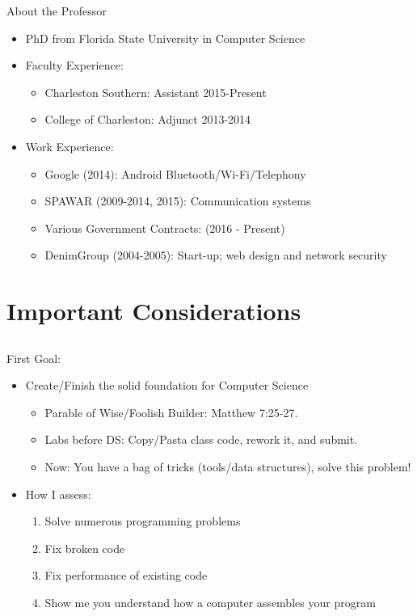 \documentclass{beamer}
\begin{document}
\begin{frame}{About the Professor}
\begin{itemize}
\item PhD from Florida State University in Computer Science
\item Faculty Experience:
\begin{itemize}
\item Charleston Southern: Assistant 2015-Present
\item College of Charleston: Adjunct 2013-2014
\end{itemize}
\item Work Experience:
\begin{itemize}
\item Google (2014): Android Bluetooth/Wi-Fi/Telephony
\item SPAWAR (2009-2014, 2015): Communication systems
\item Various Government Contracts: (2016 - Present)
\item DenimGroup (2004-2005): Start-up; web design and network security
\end{itemize}
\end{itemize}
\end{frame}

\section{Important Considerations}
\subsection{}
\begin{frame}{First Goal:}
\begin{itemize}
\item Create/Finish the solid foundation for Computer Science
\begin{itemize}
\item Parable of Wise/Foolish Builder: Matthew 7:25-27.
\item Labs before DS: Copy/Pasta class code, rework it, and submit.
\item Now: You have a bag of tricks (tools/data structures), solve this problem!
\end{itemize}
\item How I assess:
\begin{enumerate}
\item Solve numerous programming problems
\item Fix broken code
\item Fix performance of existing code
\item Show me you understand how a computer assembles your program
\end{enumerate}
\end{itemize}
\end{frame}
\end{document}
